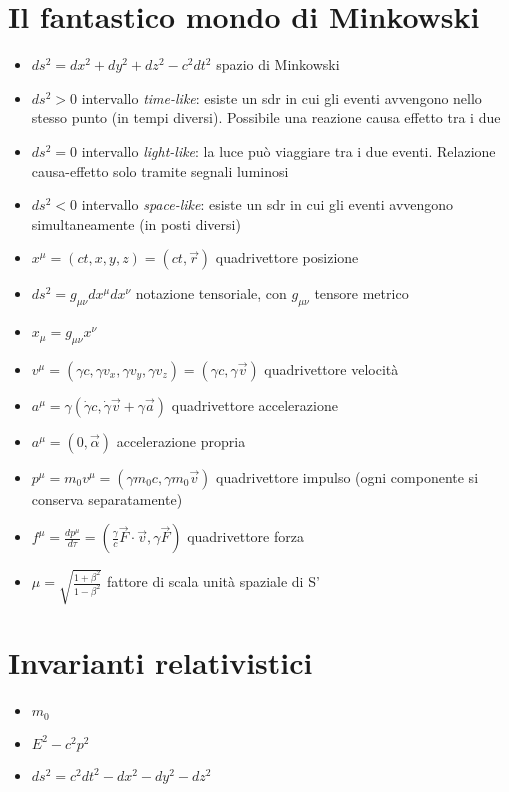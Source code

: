 \documentclass[a4paper]{article}
\begin{document}
	\section{Il fantastico mondo di Minkowski}
        \begin{itemize}
            \item $ds^2=dx^2+dy^2+dz^2-c^2dt^2$ spazio di Minkowski
            \item $ds^2>0$ intervallo \textit{time-like}: esiste un sdr in cui gli eventi avvengono nello stesso punto (in tempi diversi).
                Possibile una reazione causa effetto tra i due
            \item $ds^2=0$ intervallo \textit{light-like}: la luce può viaggiare tra i due eventi. Relazione causa-effetto solo tramite segnali luminosi
            \item $ds^2<0$ intervallo \textit{space-like}: esiste un sdr in cui gli eventi avvengono simultaneamente (in posti diversi)
            \item $x^\mu=(ct,x,y,z)=(ct,\vec{r})$ quadrivettore posizione
            \item $ds^2=g_{\mu\nu}dx^\mu d x^\nu$ notazione tensoriale, con $g_{\mu\nu}$ tensore metrico
            \item $x_\mu=g_{\mu\nu}x^\nu$
            \item $v^\mu=(\gamma c, \gamma v_x, \gamma v_y, \gamma v_z)=(\gamma c, \gamma\vec{v})$ quadrivettore velocità
            \item $a^\mu=\gamma(\dot{\gamma}c, \dot{\gamma}\vec{v}+\gamma\vec{a})$ quadrivettore accelerazione
            \item $a^\mu=(0, \vec{\alpha})$ accelerazione propria
            \item $p^\mu=m_0v^\mu=(\gamma m_0c, \gamma m_0\vec{v})$ quadrivettore impulso (ogni componente si conserva separatamente)
            \item $f^\mu=\frac{dp^\mu}{d\tau}=\left(\frac{\gamma}{c}\vec{F}\cdot\vec{v}, \gamma\vec{F}\right)$ quadrivettore forza
            \item $\mu=\sqrt{\frac{1+\beta^2}{1-\beta^2}}$ fattore di scala unità spaziale di S'
        \end{itemize}
    \section{Invarianti relativistici}
        \begin{itemize}
            \item $m_0$
            \item $E^2-c^2p^2$
            \item $ds^2=c^2dt^2-dx^2-dy^2-dz^2$
        \end{itemize}
\end{document}

